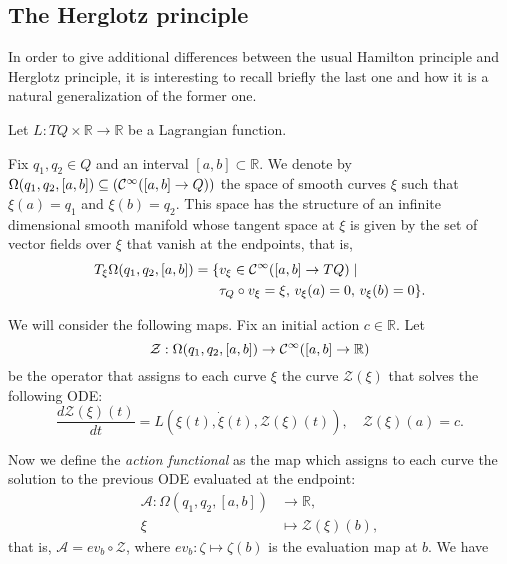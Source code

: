 \documentclass[12pt]{article}
\begin{document}
\subsection{The Herglotz principle}

In order to give additional differences between the usual Hamilton principle and Herglotz principle, it is interesting to recall briefly the last one and how it is a natural generalization of the former one.

Let $L:TQ \times \mathbb{R} \to \mathbb{R}$ be a Lagrangian function. 

Fix $q_1,q_2 \in Q$ and an interval $[a,b] \subset \mathbb{R}$. We denote by $\Omega(q_1,q_2, [a,b]) \subseteq({\cal C}^\infty([a,b]\to Q))$ the space of smooth curves $\xi$ such that $\xi(a)=q_1$ and $\xi(b)=q_2$. This space has the structure of an infinite dimensional smooth manifold whose tangent space at $\xi$ is given by the set of vector fields over $\xi$ that vanish at the endpoints, that is,
\begin{equation}
\begin{aligned}
        T_\xi \Omega(q_1,q_2, [a,b]) =  \{&
            v_\xi \in {\cal C}^\infty([a,b] \to TQ) \mid \\& 
            \tau_Q \circ v_\xi = \xi, \,v_\xi(a)=0, \, v_\xi(b)=0 
            \}.
\end{aligned}
\end{equation}


We will consider the following maps. Fix an initial action $c \in \mathbb{R}$. Let 
\begin{equation}
    \mathcal{Z}:\Omega(q_1,q_2, [a,b])  \to {\cal C}^\infty ([a,b] \to \mathbb{R})
\end{equation}
 be the operator that assigns to each curve $\xi$ the curve $\mathcal{Z}(\xi)$ that solves the following ODE:
\begin{equation}\label{contact_var_ode}
    \frac{d \mathcal{Z}(\xi)(t)}{dt} = L(\xi(t), \dot \xi(t), \mathcal{Z}(\xi)(t)), \quad \mathcal{Z}(\xi)(a)= c.
\end{equation}

Now we define the \emph{action functional} as the map which assigns to each curve the solution to the previous ODE evaluated at the endpoint:
\begin{equation}\label{contact_action}
    \begin{aligned}
        \mathcal{A}: \Omega(q_1,q_2, [a,b]) &\to \mathbb{R},\\
        \xi &\mapsto \mathcal{Z}(\xi)(b),
    \end{aligned}
\end{equation}
that is, $\mathcal{A} = ev_b \circ \mathcal{Z}$, where $ev_b: \zeta \mapsto \zeta(b)$ is the evaluation map at $b$. We have\\
\end{document}
